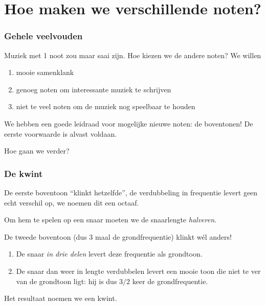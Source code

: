 \documentclass[compress, darktitle, framenumber, totalframenumber]{beamer}
\begin{document}
\section{Hoe maken we verschillende noten?}

\begin{frame}
  \frametitle{Gehele veelvouden}

  Muziek met 1 noot zou maar saai zijn. Hoe kiezen we de andere noten? \pause We willen
  \begin{enumerate}
    \item mooie samenklank
    \item \pause genoeg noten om interessante muziek te schrijven
    \item \pause niet te veel noten om de muziek nog speelbaar te houden
  \end{enumerate}

  We hebben een goede leidraad voor mogelijke nieuwe noten: de \alert{boventonen}! De eerste voorwaarde is alvast voldaan.

  Hoe gaan we verder?
\end{frame}

\begin{frame}
  \frametitle{De kwint}

  De \alert{eerste boventoon} ``klinkt hetzelfde'', de verdubbeling in frequentie levert geen echt verschil op, we noemen dit een \alert{octaaf}.

  \pause

  Om hem te spelen op een snaar moeten we de snaarlengte \emph{halveren}.

  \pause
  \vspace{1em}

  De \alert{tweede boventoon} (dus 3 maal de grondfrequentie) klinkt w\'el anders!

  \begin{enumerate}
    \item De snaar \emph{in drie delen} levert deze frequentie als grondtoon.
    \item \pause De snaar dan weer in lengte verdubbelen levert een mooie toon die niet te ver van de grondtoon ligt: hij is dus $3/2$ keer de grondfrequentie.
  \end{enumerate}
  Het resultaat noemen we een \alert{kwint}.
\end{frame}
\end{document}
